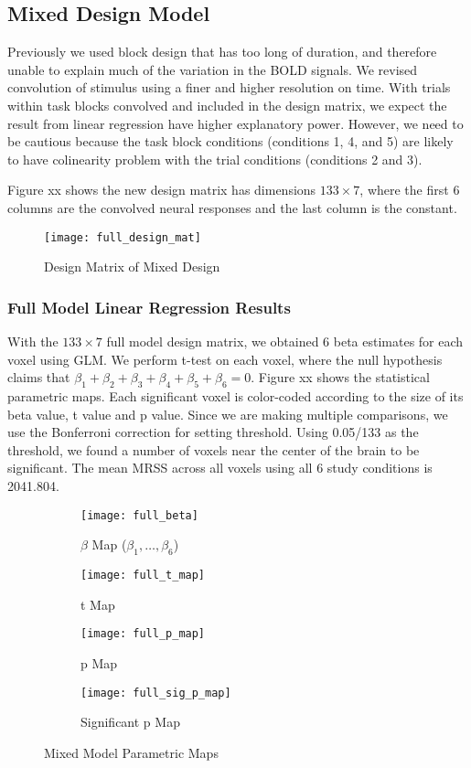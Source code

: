 \subsection{Mixed Design Model} 

Previously we used block design that has too long of duration, and therefore
unable to explain much of the variation in the BOLD signals. We revised
convolution of stimulus using a finer and higher resolution on time. With trials
within task blocks convolved and included in the design matrix, we expect the
result from linear regression have higher explanatory power. However, we need to
be cautious because the task block conditions (conditions 1, 4, and 5) are
likely to have colinearity problem with the trial conditions (conditions 2 and
3).

Figure xx shows the new design matrix has dimensions $133 \times 7$, where the
first 6 columns are the convolved neural responses and the last column is the
constant.  

\begin{figure}[!h] 
\texttt{[image: full\_design\_mat]} 
\centering
\caption{Design Matrix of Mixed Design\label{fig:mixDM}}
\end{figure}

\subsubsection{Full Model Linear Regression Results} 

With the $133 \times 7$ full model design matrix, we obtained 6 beta estimates
for each voxel using GLM. We perform t-test on each voxel, where the null
hypothesis claims that $\beta_1 + \beta_2 + \beta_3 + \beta_4 + \beta_5 +
\beta_6= 0$. Figure xx shows the statistical parametric maps. Each significant 
voxel is color-coded according to the size of its beta value, t value and p value. 
Since we are making multiple comparisons, we use the Bonferroni correction for 
setting threshold. Using 0.05/133 as the threshold, we found a number of voxels 
near the center of the brain to be significant. The mean MRSS across all voxels 
using all 6 study conditions is 2041.804.

\begin{figure}[!h]
\begin{subfigure}{.5\textwidth}
  \centering
  \texttt{[image: full\_beta]}
  \caption{$\beta$ Map ($\beta_1, \ldots, \beta_6$)}
\end{subfigure}%
\begin{subfigure}{.4\textwidth}
  \centering
  \texttt{[image: full\_t\_map]}
  \caption{t Map}
\end{subfigure}
\begin{subfigure}{.5\textwidth}
  \centering
  \texttt{[image: full\_p\_map]}
  \caption{p Map}
\end{subfigure}%
\begin{subfigure}{.5\textwidth}
  \centering
  \texttt{[image: full\_sig\_p\_map]}
  \caption{Significant p Map} 
\end{subfigure}
\caption{Mixed Model Parametric Maps\label{fig:mixMF}}
\end{figure}

